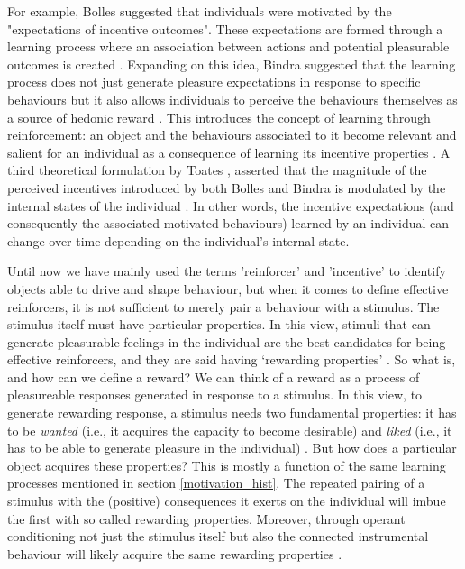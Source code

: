 For example,  Bolles \cite{bolles1972reinforcement} suggested that individuals were motivated by the "expectations of incentive outcomes". These expectations are formed through a learning process where an association between actions and potential pleasurable outcomes is created \cite{bolles1972reinforcement,berridge2004motivation}. Expanding on this idea, Bindra \cite{bindra1978adaptive} suggested that the learning process does not just generate pleasure expectations in response to specific behaviours but it also allows individuals to perceive the behaviours themselves as a source of hedonic reward \cite{bindra1978adaptive,berridge2004motivation}.
This introduces the concept of learning through reinforcement: an object and the behaviours associated to it become relevant and salient for an individual as a consequence of learning its incentive properties \cite{berridge2004motivation}. A third theoretical formulation by Toates \cite{toates1994comparing}, asserted that the magnitude of the perceived incentives introduced by both Bolles and Bindra is modulated by the internal states of the individual \cite{toates1994comparing,berridge2004motivation}. In other words, the incentive expectations (and consequently the associated motivated behaviours) learned by an individual can change over time depending on the individual's internal state. 

Until now we have mainly used the terms 'reinforcer' and 'incentive' to identify objects able to drive and shape behaviour, but when it comes to define effective reinforcers, it is not sufficient to merely pair a behaviour with a stimulus. The stimulus itself must have particular properties. In this view, stimuli that can generate pleasurable feelings in the individual are the best candidates for being effective reinforcers, and they are said having ‘rewarding properties’ \cite{berridge2004motivation}. So what is, and how can we define a reward? We can think of a reward as a process of pleasureable responses generated in response to a stimulus. In this view, to generate rewarding response, a stimulus needs two fundamental properties: it has to be \textit{wanted} (i.e., it acquires the capacity to become desirable) and \textit{liked} (i.e., it has to be able to generate pleasure in the individual) \cite{berridge2009dissecting}. But how does a particular object acquires these properties? This is mostly a function of the same learning processes mentioned in section \ref{motivation_hist}. The repeated pairing of a stimulus with the (positive) consequences it exerts on the individual will imbue the first with so called rewarding properties. Moreover, through operant conditioning not just the stimulus itself but also the connected instrumental behaviour will likely acquire the same rewarding properties \cite{berridge2009dissecting}. 

